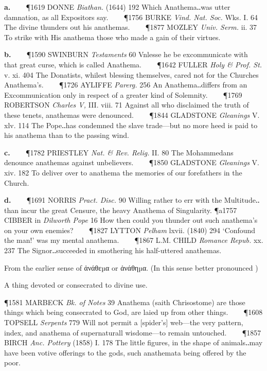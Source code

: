 \begin{description}[wide, labelwidth=!, labelindent=0pt]
\begin{myenumerate}
\textbf{a.}    
\P 1619 DONNE \textit{Biathan.} (1644) 192 Which Anathema‥was utter damnation, as all Expositors say.    
\P 1756 BURKE \textit{Vind. Nat. Soc.} Wks. I. 64 The divine thunders out his anathemas.    
\P 1877 MOZLEY \textit{Univ. Serm.} ii. 37 To strike with His anathema those who made a gain of their virtues.

\textbf{b.}    
\P 1590 SWINBURN \textit{Testaments} 60 Vnlesse he be excommunicate with that great curse, which is called Anathema.    
\P 1642 FULLER \textit{Holy \& Prof. St.} v. xi. 404 The Donatists, whilest blessing themselves, cared not for the Churches Anathema's.    
\P 1726 AYLIFFE \textit{Parerg.} 256 An Anathema‥differs from an Excommunication only in respect of a greater kind of Solemnity.    
\P 1769 ROBERTSON \textit{Charles V,} III. viii. 71 Against all who disclaimed the truth of these tenets, anathemas were denounced.    
\P 1844 GLADSTONE \textit{Gleanings} V. xlv. 114 The Pope‥has condemned the slave trade—but no more heed is paid to his anathema than to the passing wind.

\textbf{c.}    
\P 1782 PRIESTLEY \textit{Nat. \& Rev. Relig.} II. 80 The Mohammedans denounce anathemas against unbelievers.    
\P 1850 GLADSTONE \textit{Gleanings} V. xiv. 182 To deliver over to anathema the memories of our forefathers in the Church.

\textbf{d.}    
\P 1691 NORRIS \textit{Pract. Disc.} 90 Willing rather to err with the Multitude‥than incur the great Censure, the heavy Anathema of Singularity. 
\P a1757 CIBBER in \textit{Dilworth Pope} 16 How then could you thunder out such anathema's on your own enemies?    
\P 1827 LYTTON \textit{Pelham} lxvii. (1840) 294 ‘Confound the man!’ was my mental anathema.    
\P 1867 L.M. CHILD \textit{Romance Repub.} xx. 237 The Signor‥succeeded in smothering his half-uttered anathemas.

 From the earlier sense of ἀνάθεµα or ἀνάθηµα. (In this sense better 
pronounced ) 

 A thing devoted or consecrated to divine use. 

\P 1581 MARBECK \textit{Bk. of Notes} 39 Anathema (saith Chrisostome) are those things which being consecrated to God, are laied up from other things.    
\P 1608 TOPSELL \textit{Serpents} 779 Will not permit a [spider's] web—the very pattern, index, and anathema of supernaturall wisdome—to remain untouched.    
\P 1857 BIRCH \textit{Anc. Pottery} (1858) I. 178 The little figures, in the shape of animals‥may have been votive offerings to the gods, such anathemata being offered by the poor.
 

\end{myenumerate}
\end{description}
